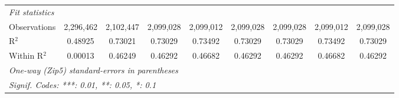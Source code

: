 \begin{table}[H]
{\begin{tabular}{lcccccccc}
 \midrule \emph{Fit statistics}&  & & & & & & & \\ 

 Observations & 2,296,462&2,102,447&2,099,028&2,099,012&2,099,028&2,099,028&2,099,012&2,099,028\\ 

 R$^2$ & 0.48925&0.73021&0.73029&0.73492&0.73029&0.73029&0.73492&0.73029\\ 

 Within R$^2$ & 0.00013&0.46249&0.46292&0.46682&0.46292&0.46292&0.46682&0.46292\\ 

 \midrule\midrule\multicolumn{9}{l}{\emph{One-way (Zip5) standard-errors in parentheses}}\\ 

 \multicolumn{9}{l}{\emph{Signif. Codes: ***: 0.01, **: 0.05, *: 0.1}}\\ 

 \end{tabular}} 

 \end{table} 

  

